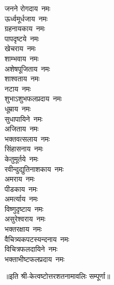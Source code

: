 \begin{flushleft}
\begin{multicols}{2}
जनने रोगदाय~नमः\\
ऊर्ध्वमूर्धजाय~नमः\\
ग्रहनायकाय~नमः\\
पापदृष्टये~नमः\\
खेचराय~नमः\\
शाम्भवाय~नमः\\
अशेषपूजिताय~नमः\\
शाश्वताय~नमः\hfill{}\\
नटाय~नमः\\
शुभाऽशुभफलप्रदाय~नमः\\
धूम्राय~नमः\\
सुधापायिने~नमः\\
अजिताय~नमः\\
भक्तवत्सलाय~नमः\\
सिंहासनाय~नमः\\
केतुमूर्तये~नमः\\
रवीन्दुद्युतिनाशकाय~नमः\\
अमराय~नमः\hfill{}\\
पीडकाय~नमः\\
अमर्त्याय~नमः\\
विष्णुदृष्टाय~नमः\\
असुरेश्वराय~नमः\\
भक्तरक्षाय~नमः\\
वैचित्र्यकपटस्यन्दनाय~नमः\\
विचित्रफलदायिने~नमः\\
भक्ताभीष्टफलप्रदाय~नमः\\
\end{multicols}
\end{flushleft}
॥इति श्री-केत्वष्टोत्तरशतनामावलिः सम्पूर्णा॥
